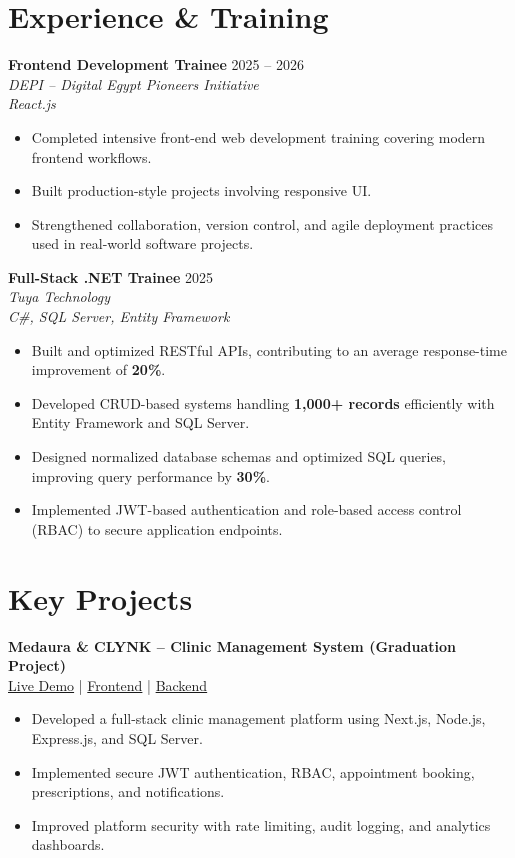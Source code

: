 \documentclass[10pt, letterpaper]{article}
\newenvironment{highlights}{
    \begin{itemize}[
        topsep=0.10 cm,
        parsep=0.04 cm,
        itemsep=0.04 cm,
        leftmargin=0.5 cm
    ]
}{\end{itemize}}
\begin{document}
\section{Experience \& Training}
\textbf{Frontend Development Trainee} \hfill {2025 -- 2026} \\
\textit{DEPI -- Digital Egypt Pioneers Initiative} \\
\textit{React.js}
\begin{highlights}
    \item Completed intensive front-end web development training covering modern frontend workflows.
    \item Built production-style projects involving responsive UI.
    \item Strengthened collaboration, version control, and agile deployment practices used in real-world software projects.
\end{highlights}
\textbf{Full-Stack .NET Trainee} \hfill {2025} \\
\textit{Tuya Technology} \\
\textit{C\#, SQL Server, Entity Framework}
\begin{highlights}
    \item Built and optimized RESTful APIs, contributing to an average response-time improvement of \textbf{20\%}.
    \item Developed CRUD-based systems handling \textbf{1,000+ records} efficiently with Entity Framework and SQL Server.
    \item Designed normalized database schemas and optimized SQL queries, improving query performance by \textbf{30\%}.
    \item Implemented JWT-based authentication and role-based access control (RBAC) to secure application endpoints.
\end{highlights}
\section{Key Projects}

\textbf{Medaura \& CLYNK -- Clinic Management System (Graduation Project)} \\
\href{https://medaura-pi.vercel.app/}{Live Demo} | \href{https://github.com/Mohamed-Khayyal/Medaura}{Frontend} | \href{https://github.com/Mohamed-Khayyal/CLYNK}{Backend}
\begin{highlights}
    \item Developed a full-stack clinic management platform using Next.js, Node.js, Express.js, and SQL Server.
    \item Implemented secure JWT authentication, RBAC, appointment booking, prescriptions, and notifications.
    \item Improved platform security with rate limiting, audit logging, and analytics dashboards.
\end{highlights}
\end{document}
